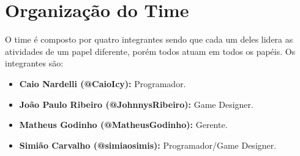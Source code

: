 \section{Organização do Time}

O time é composto por quatro integrantes sendo que cada um deles lidera as atividades de um papel diferente, porém todos atuam em todos os papéis. Os integrantes são:

\begin{itemize}
\item\textbf{Caio Nardelli (@CaioIcy):} Programador. 
\item\textbf{João Paulo Ribeiro (@JohnnysRibeiro):} Game Designer.
\item\textbf{Matheus Godinho (@MatheusGodinho):} Gerente.
\item\textbf{Simião Carvalho (@simiaosimis):} Programador/Game Designer.
\end{itemize}
